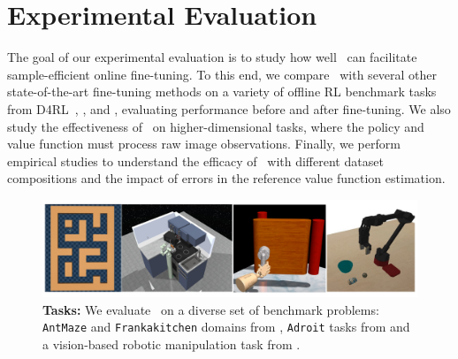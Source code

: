 \vspace{-0.09cm}
\section{Experimental Evaluation}
\vspace{-0.22cm}
\label{sec:experiments}
The goal of our experimental evaluation is to study how well \methodname\ can facilitate sample-efficient online fine-tuning. To this end, we compare \methodname\ with several other state-of-the-art fine-tuning methods on a variety of offline RL benchmark tasks from D4RL~\cite{fu2020d4rl}, \citet{singh2020cog}, and \citet{nair2020accelerating}, evaluating performance before and after fine-tuning. We also study the effectiveness of \methodname\ on higher-dimensional tasks, where the policy and value function must process raw image observations. Finally, we perform empirical studies to understand the efficacy of \methodname\ with different dataset compositions and the impact of errors in the reference value function estimation.

\begin{figure}
\centering
\vspace{-0.45cm}
\includegraphics[width=0.95\linewidth]{chapters/cal_ql/figs-sample/envs_final.pdf}
\vspace{-0.25cm}
\caption{
\footnotesize{\textbf{Tasks:} We evaluate \methodname\ on a diverse set of benchmark problems: \texttt{AntMaze} and \texttt{Frankakitchen} domains from \cite{fu2020d4rl}, \texttt{Adroit} tasks from \cite{nair2020accelerating} and a vision-based robotic manipulation task from \cite{kumar2022pre}.}}
\label{fig:envs}
\vspace{-0.2cm}
\end{figure}


